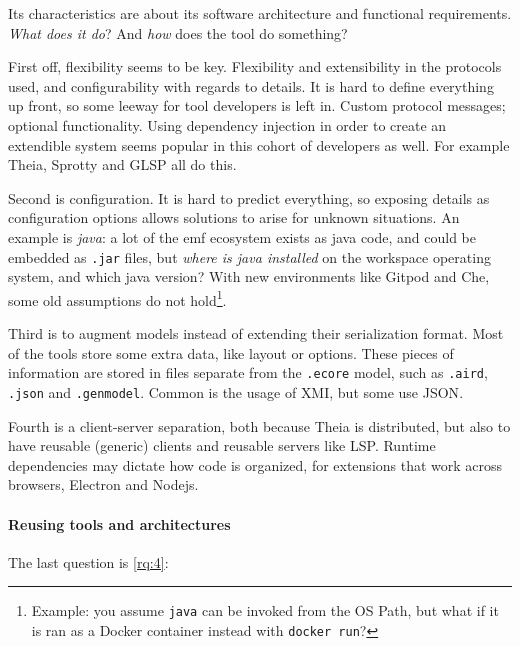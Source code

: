 Its characteristics are about its software architecture and functional requirements.
\textit{What does it do}?
And \textit{how} does the tool do something?

First off, flexibility seems to be key.
Flexibility and extensibility in the protocols used, and configurability with regards to details.
It is hard to define everything up front, so some leeway for tool developers is left in.
Custom protocol messages; optional functionality.
Using dependency injection in order to create an extendible system seems popular in this cohort of developers as well.
For example \gls{Theia}, Sprotty and \gls{GLSP} all do this.

Second is configuration. 
It is hard to predict everything, so exposing details as configuration options allows solutions to arise for unknown situations.
An example is \textit{java}: a lot of the \gls{emf} ecosystem exists as java code, and could be embedded as \texttt{.jar} files, but \emph{where is java installed} on the workspace operating system, and which java version?
With new environments like Gitpod and Che, some old assumptions do not hold\footnote{Example: you assume \texttt{java} can be invoked from the OS Path, but what if it is ran as a Docker container instead with \texttt{docker run}?}.

Third is to augment models instead of extending their serialization format.
Most of the tools store some extra data, like layout or options.
These pieces of information are stored in files separate from the \texttt{.ecore} model, such as \texttt{.aird}, \texttt{.json} and \texttt{.genmodel}.
Common is the usage of \gls{XMI}, but some use \gls{JSON}.

Fourth is a client-server separation, both because \gls{Theia} is distributed, but also to have reusable (generic) clients and reusable servers like \gls{LSP}.
Runtime dependencies may dictate how code is organized, for extensions that work across browsers, \gls{Electron} and \gls{Nodejs}.



\paragraph*{Reusing tools and architectures}
The last question is \cref{rq:4}:
\begin{displayquote}
  
\end{displayquote}

